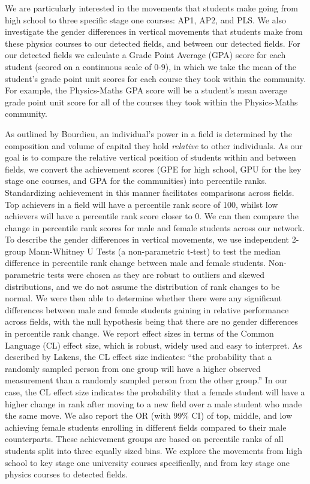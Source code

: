 We are particularly interested in the movements that students make going from high school to three specific stage one courses: AP1, AP2, and PLS. We also investigate the gender differences in vertical movements that students make from these physics courses to our detected fields, and between our detected fields. For our detected fields we calculate a Grade Point Average (GPA) score for each student (scored on a continuous scale of 0-9), in which we take the mean of the student's grade point unit scores for each course they took within the community. For example, the Physics-Maths GPA score will be a student's mean average grade point unit score for all of the courses they took within the Physics-Maths community.

As outlined by Bourdieu, an individual's power in a field is determined by the composition and volume of capital they hold \textit{relative} to other individuals. As our goal is to compare the relative vertical position of students within and between fields, we convert the achievement scores (GPE for high school, GPU for the key stage one courses, and GPA for the communities) into percentile ranks. Standardizing achievement in this manner facilitates comparisons across fields. Top achievers in a field will have a percentile rank score of 100, whilst low achievers will have a percentile rank score closer to 0. We can then compare the change in percentile rank scores for male and female students across our network. To describe the gender differences in vertical movements, we use independent 2-group Mann-Whitney U Tests (a non-parametric t-test) to test the median difference in percentile rank change between male and female students. Non-parametric tests were chosen as they are robust to outliers and skewed distributions\cite{erceg2008modern}, and we do not assume the distribution of rank changes to be normal. We were then able to determine whether there were any significant differences between male and female students gaining in relative performance across fields, with the null hypothesis being that there are no gender differences in percentile rank change. We report effect sizes in terms of the Common Language (CL) effect size\cite{mcgraw1992common}, which is robust, widely used and easy to interpret.\cite{erceg2008modern, lakens2013calculating, kerby2014simple} As described by Lakens\cite{lakens2013calculating}, the CL effect size indicates: ``the probability that a randomly sampled person from one group will have a higher observed measurement than a randomly sampled person from the other group.'' In our case, the CL effect size indicates the probability that a female student will have a higher change in rank after moving to a new field over a male student who made the same move. We also report the OR (with 99\% CI) of top, middle, and low achieving female students enrolling in different fields compared to their male counterparts. These achievement groups are based on percentile ranks of all students split into three equally sized bins. We explore the movements from high school to key stage one university courses specifically, and from key stage one physics courses to detected fields. 

